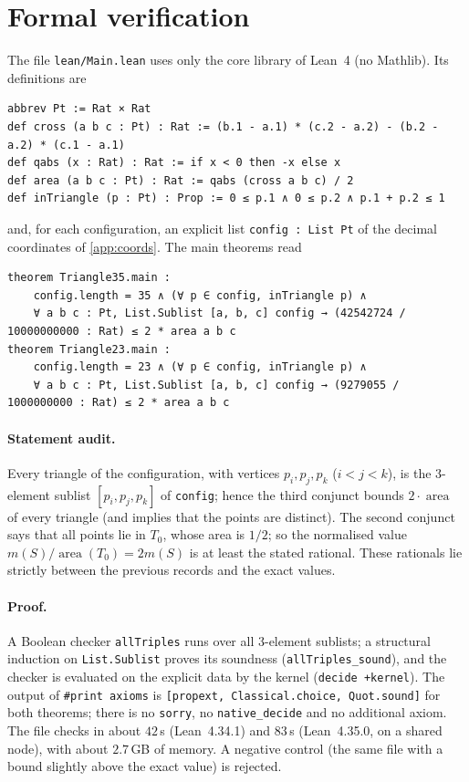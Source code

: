 \documentclass[11pt]{article}
\theoremstyle{definition}
\theoremstyle{remark}
\begin{document}
\section{Formal verification}\label{sec:lean}
The file \texttt{lean/Main.lean} uses only the core library of Lean~4 (no Mathlib). Its
definitions are
\begin{lstlisting}
abbrev Pt := Rat × Rat
def cross (a b c : Pt) : Rat := (b.1 - a.1) * (c.2 - a.2) - (b.2 - a.2) * (c.1 - a.1)
def qabs (x : Rat) : Rat := if x < 0 then -x else x
def area (a b c : Pt) : Rat := qabs (cross a b c) / 2
def inTriangle (p : Pt) : Prop := 0 ≤ p.1 ∧ 0 ≤ p.2 ∧ p.1 + p.2 ≤ 1
\end{lstlisting}
and, for each configuration, an explicit list \texttt{config : List Pt} of the decimal coordinates
of \cref{app:coords}. The main theorems read
\begin{lstlisting}
theorem Triangle35.main :
    config.length = 35 ∧ (∀ p ∈ config, inTriangle p) ∧
    ∀ a b c : Pt, List.Sublist [a, b, c] config → (42542724 / 10000000000 : Rat) ≤ 2 * area a b c
theorem Triangle23.main :
    config.length = 23 ∧ (∀ p ∈ config, inTriangle p) ∧
    ∀ a b c : Pt, List.Sublist [a, b, c] config → (9279055 / 1000000000 : Rat) ≤ 2 * area a b c
\end{lstlisting}
\paragraph{Statement audit.} Every triangle of the configuration, with vertices $p_i,p_j,p_k$
($i<j<k$), is the $3$-element sublist $[p_i,p_j,p_k]$ of \texttt{config}; hence the third conjunct
bounds $2\cdot\operatorname{area}$ of every triangle (and implies that the points are distinct).
The second conjunct says that all points lie in $T_0$, whose area is $1/2$; so the normalised value
$m(S)/\operatorname{area}(T_0)=2m(S)$ is at least the stated rational. These rationals lie strictly
between the previous records and the exact values.

\paragraph{Proof.} A Boolean checker \texttt{allTriples} runs over all $3$-element sublists; a
structural induction on \texttt{List.Sublist} proves its soundness (\texttt{allTriples\_sound}), and
the checker is evaluated on the explicit data by the kernel (\texttt{decide +kernel}). The output of
\texttt{\#print axioms} is \texttt{[propext, Classical.choice, Quot.sound]} for both theorems; there is
no \texttt{sorry}, no \texttt{native\_decide} and no additional axiom. The file checks in about
$42$\,s (Lean~4.34.1) and $83$\,s (Lean~4.35.0, on a shared node), with about $2.7$\,GB of memory.
A negative control (the same file with a bound slightly above the exact value) is rejected.
\end{document}
